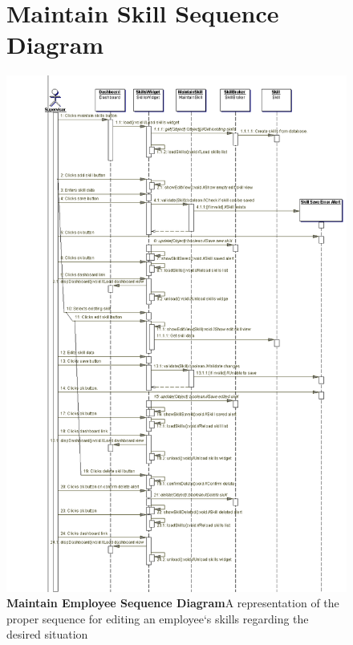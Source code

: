 \documentclass[letterpaper,12pt]{report}
\begin{document}
\begin{figure}[hbp]
 \section{Maintain Skill Sequence Diagram}
 \includegraphics[scale=0.45]{externals/MaintainSkillSequence.png}
 \caption{\small
\textbf{Maintain Employee Sequence Diagram}\newline A representation of the proper sequence for editing an employee`s skills regarding the desired situation}\label{fig:seqMaintEmp}
\end{figure}
\newpage
\end{document}
